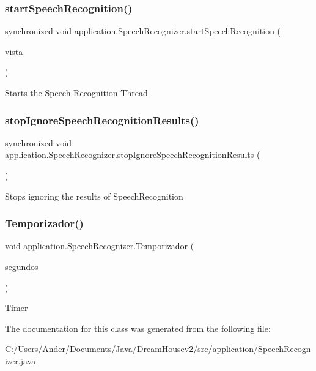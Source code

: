 \subsubsection{\texorpdfstring{start\+Speech\+Recognition()}{startSpeechRecognition()}}
{\footnotesize\ttfamily synchronized void application.\+Speech\+Recognizer.\+start\+Speech\+Recognition (\begin{DoxyParamCaption}\item[{\mbox{\hyperlink{classvista_1_1_ventana_principal}{Ventana\+Principal}}}]{vista }\end{DoxyParamCaption})}

Starts the Speech Recognition Thread \mbox{\label{classapplication_1_1_speech_recognizer_a6c9ee420dd7fcf9b6aeda63361b0c819}} 
\subsubsection{\texorpdfstring{stop\+Ignore\+Speech\+Recognition\+Results()}{stopIgnoreSpeechRecognitionResults()}}
{\footnotesize\ttfamily synchronized void application.\+Speech\+Recognizer.\+stop\+Ignore\+Speech\+Recognition\+Results (\begin{DoxyParamCaption}{ }\end{DoxyParamCaption})}

Stops ignoring the results of Speech\+Recognition \mbox{\label{classapplication_1_1_speech_recognizer_a52344e31f4d4cec33c0713387a10c235}} 
\subsubsection{\texorpdfstring{Temporizador()}{Temporizador()}}
{\footnotesize\ttfamily void application.\+Speech\+Recognizer.\+Temporizador (\begin{DoxyParamCaption}\item[{int}]{segundos }\end{DoxyParamCaption})}

Timer 

The documentation for this class was generated from the following file\+:\begin{DoxyCompactItemize}
\item 
C\+:/\+Users/\+Ander/\+Documents/\+Java/\+Dream\+Housev2/src/application/Speech\+Recognizer.\+java\end{DoxyCompactItemize}
